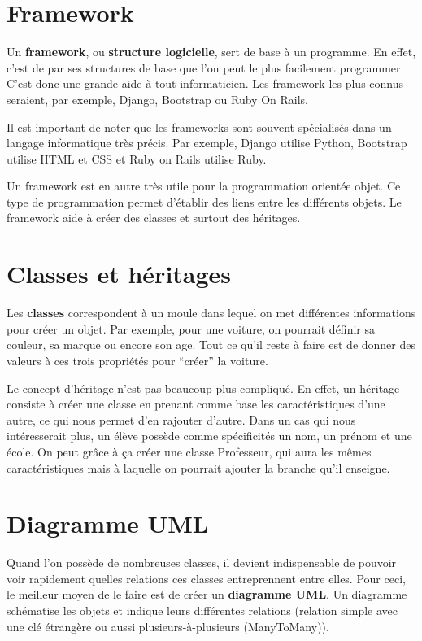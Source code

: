 \documentclass[letterpaper,10pt,french]{sphinxmanual}
\begin{document}
\section{Framework}
\label{introduction:framework}
Un \textbf{framework}, ou \textbf{structure logicielle}, sert de base à un programme.
En effet, c'est de par ses structures de base que l'on peut le plus facilement
programmer. C'est donc une grande aide à tout informaticien. Les framework les
plus connus seraient, par exemple, Django, Bootstrap ou Ruby On Rails.

Il est important de noter que les frameworks sont souvent spécialisés dans un
langage informatique très précis. Par exemple, Django utilise Python, Bootstrap
utilise HTML et CSS et Ruby on Rails utilise Ruby.

Un framework est en autre très utile pour la programmation orientée objet. Ce
type de programmation permet d'établir des liens entre les différents objets.
Le framework aide à créer des classes et surtout des héritages.


\section{Classes et héritages}
\label{introduction:classes-et-heritages}
Les \textbf{classes} correspondent à un moule dans lequel on met différentes
informations pour créer un objet. Par exemple, pour une voiture, on pourrait
définir sa couleur, sa marque ou encore son age. Tout ce qu'il reste à faire
est de donner des valeurs à ces trois propriétés pour ``créer'' la voiture.

Le concept d'héritage n'est pas beaucoup plus compliqué. En effet, un héritage
consiste à créer une classe en prenant comme base les caractéristiques d'une
autre, ce qui nous permet d'en rajouter d'autre. Dans un cas qui nous
intéresserait plus, un élève possède comme spécificités un nom, un prénom et
une école. On peut grâce à ça créer une classe Professeur, qui aura les
mêmes caractéristiques mais à laquelle on pourrait ajouter la branche qu'il
enseigne.


\section{Diagramme UML}
\label{introduction:diagramme-uml}
Quand l'on possède de nombreuses classes, il devient indispensable de pouvoir
voir rapidement quelles relations ces classes entreprennent entre elles. Pour
ceci, le meilleur moyen de le faire est de créer un \textbf{diagramme UML}. Un diagramme
schématise les objets et indique leurs différentes relations (relation simple
avec une clé étrangère ou aussi plusieurs-à-plusieurs (ManyToMany)).
\end{document}
